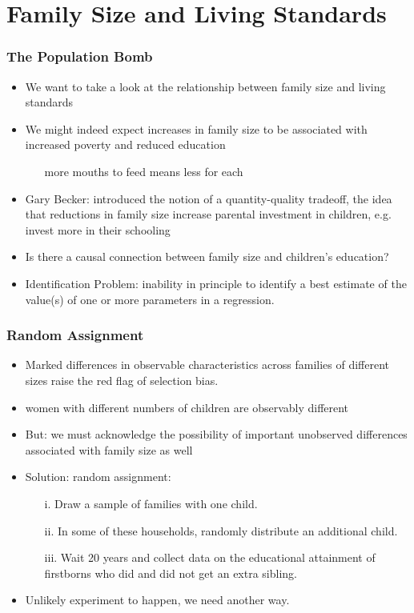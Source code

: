 \documentclass{beamer}
\begin{document}
\section{Family Size and Living Standards}
\begin{frame}
\frametitle{The Population Bomb}
\begin{itemize}
	\item We want to take a look at the relationship between family size and living standards
	\item We might indeed expect increases in family size to be associated with increased poverty and reduced education
		\begin{itemize}
			\item [\rightarrow] more mouths to feed means less for each
		\end{itemize}
	\item Gary Becker: introduced the notion of a quantity-quality tradeoff, the idea that reductions in family size increase parental investment in children, e.g. invest more in their schooling
\item Is there a causal connection between family size and children’s education?
\item Identification Problem: inability in principle to identify a best estimate of the value(s) of one or more parameters in a regression. 
\end{itemize}

\end{frame}



\begin{frame}
\frametitle{Random Assignment}
\begin{itemize}
	\item Marked differences in observable characteristics across families of different sizes raise the red flag of
selection bias.
	\item women with different numbers of children are observably different
	\item But: we must acknowledge the possibility of important unobserved differences associated with family size as well
	\item Solution: random assignment: 
	\begin{itemize}
		\item[i.] Draw a sample of families with one child.
		\item[ii.] In some of these households, randomly distribute an additional child.
		\item[iii.] Wait 20 years and collect data on the educational attainment of firstborns who did and did not get an extra sibling.
	\end{itemize}
	\item Unlikely experiment to happen, we need another way.
\end{itemize}

\end{frame}
\end{document}
